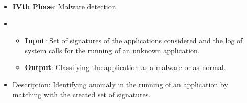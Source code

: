 \begin{itemize}
    \item[] \textbf{IVth Phase}: Malware detection
    \item[] \begin{itemize}
                \item[] \textbf{Input}: Set of signatures of the applications considered and the log of system calls for the running of an unknown application.
                \item[] \textbf{Output}: Classifying the application as a malware or as normal.
            \end{itemize}
    \item[] Description: Identifying anomaly in the running of an application by matching with the created set of signatures.
\end{itemize}
